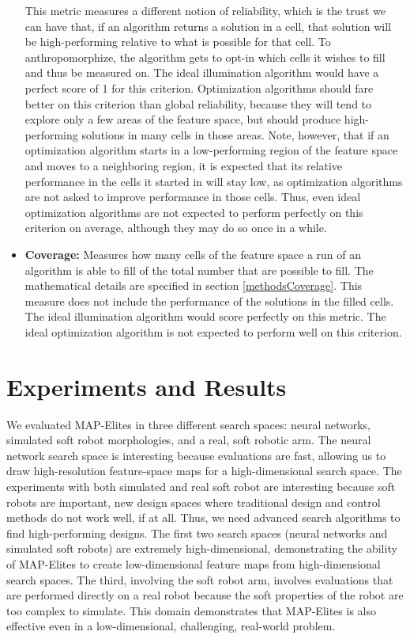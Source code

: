 \documentclass[twocolumn, DIV25, 9pt]{scrartcl}
\begin{document}
\begin{itemize}
{This metric measures a different notion of reliability, which is the trust we can have that, if an algorithm returns a solution in a cell, that solution will be high-performing relative to what is possible for that cell. To anthropomorphize, the algorithm gets to opt-in which cells it wishes to fill and thus be measured on. The ideal illumination algorithm would have a perfect score of 1 for this criterion. Optimization algorithms should fare better on this criterion than global reliability, because they will tend to explore only a few areas of the feature space, but should produce high-performing solutions in many cells in those areas. Note, however, that if an optimization algorithm starts in a low-performing region of the feature space and moves to a neighboring region, it is expected that its relative performance in the cells it started in will stay low, as optimization algorithms are not asked to improve performance in those cells. Thus, even ideal optimization algorithms are not expected to perform perfectly on this criterion on average, although they may do so once in a while.
}

\item{\textbf{Coverage:} Measures how many cells of the feature space a run of an algorithm is able to fill of the total number that are possible to fill. The mathematical details are specified in section \ref{methodsCoverage}. This measure does not include the performance of the solutions in the filled cells. The ideal illumination algorithm would score perfectly on this metric. The ideal optimization algorithm is not expected to perform well on this criterion.}

\end{itemize}

\section{Experiments and Results}
We evaluated MAP-Elites in three different search spaces: neural networks, simulated soft robot morphologies, and a real, soft robotic arm. The neural network search space is interesting because evaluations are fast, allowing us to draw high-resolution feature-space maps for a high-dimensional search space. The experiments with both simulated and real soft robot are interesting because soft robots are important, new design spaces where traditional design and control methods do not work well, if at all. Thus, we need advanced search algorithms to find high-performing designs. The first two search spaces (neural networks and simulated soft robots) are extremely high-dimensional, demonstrating the ability of MAP-Elites to create low-dimensional feature maps from high-dimensional search spaces. The third, involving the soft robot arm,  involves evaluations that are performed directly on a real robot because the soft properties of the robot are too complex to simulate. This domain demonstrates that MAP-Elites is also effective even in a low-dimensional, challenging, real-world problem. 
\end{document}
